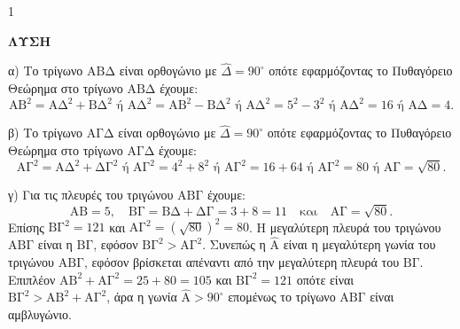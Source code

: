 \begin{ylh}{1}
    \item [Ύλη από εικόνα]
\end{ylh}
\textbf{ΛΥΣΗ}
\begin{alist}
\item α) Το τρίγωνο $\text{ΑΒΔ}$ είναι ορθογώνιο με $\hat{\Delta} = 90^\circ$ οπότε εφαρμόζοντας το Πυθαγόρειο Θεώρημα στο τρίγωνο $\text{ΑΒΔ}$ έχουμε:
\[ \text{ΑΒ}^2 = \text{ΑΔ}^2 + \text{ΒΔ}^2 \text{ ή } \text{ΑΔ}^2 = \text{ΑΒ}^2 - \text{ΒΔ}^2 \text{ ή } \text{ΑΔ}^2 = 5^2 - 3^2 \text{ ή } \text{ΑΔ}^2 = 16 \text{ ή } \text{ΑΔ} = 4. \]
\item β) Το τρίγωνο $\text{ΑΓΔ}$ είναι ορθογώνιο με $\hat{\Delta} = 90^\circ$ οπότε εφαρμόζοντας το Πυθαγόρειο Θεώρημα στο τρίγωνο $\text{ΑΓΔ}$ έχουμε:
\[ \text{ΑΓ}^2 = \text{ΑΔ}^2 + \text{ΔΓ}^2 \text{ ή } \text{ΑΓ}^2 = 4^2 + 8^2 \text{ ή } \text{ΑΓ}^2 = 16 + 64 \text{ ή } \text{ΑΓ}^2 = 80 \text{ ή } \text{ΑΓ} = \sqrt{80}. \]
\item γ) Για τις πλευρές του τριγώνου $\text{ΑΒΓ}$ έχουμε:
\[ \text{ΑΒ} = 5, \quad \text{ΒΓ} = \text{ΒΔ} + \text{ΔΓ} = 3 + 8 = 11 \quad \text{και} \quad \text{ΑΓ} = \sqrt{80}. \]
Επίσης $\text{ΒΓ}^2 = 121$ και $\text{ΑΓ}^2 = (\sqrt{80})^2 = 80$.
Η μεγαλύτερη πλευρά του τριγώνου $\text{ΑΒΓ}$ είναι η $\text{ΒΓ}$, εφόσον $\text{ΒΓ}^2 > \text{ΑΓ}^2$.
Συνεπώς η $\hat{\text{Α}}$ είναι η μεγαλύτερη γωνία του τριγώνου $\text{ΑΒΓ}$, εφόσον βρίσκεται απέναντι από την μεγαλύτερη πλευρά του $\text{ΒΓ}$.
Επιπλέον $\text{ΑΒ}^2 + \text{ΑΓ}^2 = 25 + 80 = 105$ και $\text{ΒΓ}^2 = 121$ οπότε είναι $\text{ΒΓ}^2 > \text{ΑΒ}^2 + \text{ΑΓ}^2$, άρα η γωνία $\hat{\text{Α}} > 90^\circ$ επομένως το τρίγωνο $\text{ΑΒΓ}$ είναι αμβλυγώνιο.
\end{alist}